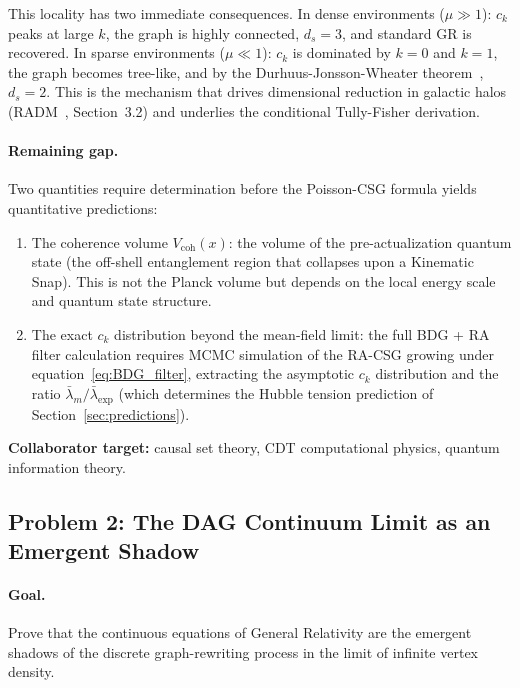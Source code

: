\documentclass[11pt,a4paper]{article}
\theoremstyle{plain}
\theoremstyle{definition}
\theoremstyle{remark}
\begin{document}
This locality has two immediate consequences. In dense environments
($\mu \gg 1$): $c_k$ peaks at large $k$, the graph is highly connected, $d_s
= 3$, and standard GR is recovered. In sparse environments ($\mu \ll 1$): $c_k$
is dominated by $k = 0$ and $k = 1$, the graph becomes tree-like, and by the
Durhuus-Jonsson-Wheater theorem~\citep{Durhuus2010}, $d_s = 2$. This is the
mechanism that drives dimensional reduction in galactic halos
(RADM~\citep{Sandeman2026RADM}, Section~3.2) and underlies the conditional
Tully-Fisher derivation.

\paragraph{Remaining gap.}
Two quantities require determination before the Poisson-CSG formula yields
quantitative predictions:
\begin{enumerate}
\item The coherence volume $V_{\mathrm{coh}}(x)$: the volume of the
  pre-actualization quantum state (the off-shell entanglement region that
  collapses upon a Kinematic Snap). This is not the Planck volume but depends
  on the local energy scale and quantum state structure.
\item The exact $c_k$ distribution beyond the mean-field limit: the full BDG
  + RA filter calculation requires MCMC simulation of the RA-CSG growing under
  equation~\eqref{eq:BDG_filter}, extracting the asymptotic $c_k$ distribution
  and the ratio $\bar\lambda_m/\bar\lambda_{\mathrm{exp}}$ (which determines
  the Hubble tension prediction of Section~\ref{sec:predictions}).
\end{enumerate}
\textbf{Collaborator target:} causal set theory, CDT computational physics,
quantum information theory.

\subsection{Problem 2: The DAG Continuum Limit as an Emergent Shadow}
\label{sec:continuum}

\paragraph{Goal.} Prove that the continuous equations of General Relativity are
the emergent shadows of the discrete graph-rewriting process in the limit of
infinite vertex density.
\end{document}
